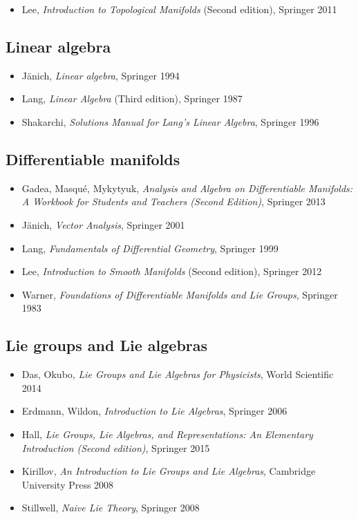 \begin{itemize}
\item Lee, \textit{Introduction to Topological Manifolds} (Second edition), Springer 2011
\end{itemize}

\subsection*{Linear algebra}

\begin{itemize}
\item J\"anich, \textit{Linear algebra}, Springer 1994
\item Lang, \textit{Linear Algebra} (Third edition), Springer 1987
\item Shakarchi, \textit{Solutions Manual for Lang's Linear Algebra}, Springer 1996
\end{itemize}

\subsection*{Differentiable manifolds}

\begin{itemize}
\item Gadea, Masqu\'e, Mykytyuk, \textit{Analysis and Algebra on Differentiable Manifolds: A Workbook for Students and Teachers (Second Edition)}, Springer 2013
\item J\"anich, \textit{Vector Analysis}, Springer 2001
\item Lang, \textit{Fundamentals of Differential Geometry}, Springer 1999
\item Lee, \textit{Introduction to Smooth Manifolds} (Second edition), Springer 2012
\item Warner, \textit{Foundations of Differentiable Manifolds and Lie Groups}, Springer 1983
\end{itemize}

\subsection*{Lie groups and Lie algebras}

\begin{itemize}
\item Das, Okubo, \textit{Lie Groups and Lie Algebras for Physicists}, World Scientific 2014
\item Erdmann, Wildon, \textit{Introduction to Lie Algebras}, Springer 2006
\item Hall, \textit{Lie Groups, Lie Algebras, and Representations: An Elementary Introduction (Second edition)}, Springer 2015
\item Kirillov, \textit{An Introduction to Lie Groups and Lie Algebras}, Cambridge University Press 2008
\item Stillwell, \textit{Naive Lie Theory}, Springer 2008
\end{itemize}

